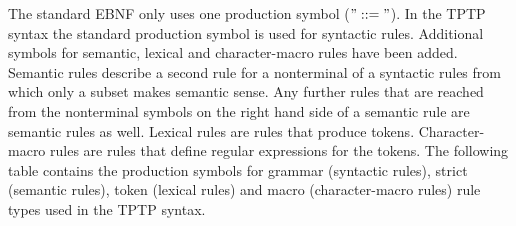 %

The standard \ac{EBNF} only uses one production symbol ($"::="$).
In the \ac{TPTP} syntax the standard production symbol is used for syntactic rules.
Additional symbols for semantic, lexical and character-macro rules have been added. Semantic rules describe a second rule for a nonterminal of a syntactic rules from which only a subset makes semantic sense. Any further rules that are reached from the nonterminal symbols on the right hand side of a semantic rule are semantic rules as well. Lexical rules are rules that produce tokens. Character-macro rules are rules that define regular expressions for the tokens.
The following table contains the production symbols for grammar (syntactic rules), strict (semantic rules), token (lexical rules) and macro (character-macro rules) rule types used in the \ac{TPTP} syntax.

